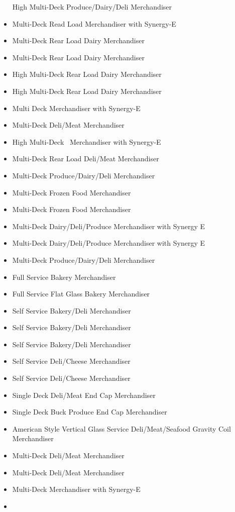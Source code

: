 \begin{itemize}
  High Multi-Deck Produce/Dairy/Deli Merchandiser
\item
  Multi-Deck Read Load Merchandiser with Synergy-E
\item
  Multi-Deck Rear Load Dairy Merchandiser
\item
  Multi-Deck Rear Load Dairy Merchandiser
\item
  High Multi-Deck Rear Load Dairy Merchandiser
\item
  High Multi-Deck Rear Load Dairy Merchandiser
\item
  Multi Deck Merchandiser with Synergy-E
\item
  Multi-Deck Deli/Meat Merchandiser
\item
  High Multi-Deck~ Merchandiser with Synergy-E
\item
  Multi-Deck Rear Load Deli/Meat Merchandiser
\item
  Multi-Deck Produce/Dairy/Deli Merchandiser
\item
  Multi-Deck Frozen Food Merchandiser
\item
  Multi-Deck Frozen Food Merchandiser
\item
  Multi-Deck Dairy/Deli/Produce Merchandiser with Synergy E
\item
  Multi-Deck Dairy/Deli/Produce Merchandiser with Synergy E
\item
  Multi-Deck Produce/Dairy/Deli Merchandiser
\item
  Full Service Bakery Merchandiser
\item
  Full Service Flat Glass Bakery Merchandiser
\item
  Self Service Bakery/Deli Merchandiser
\item
  Self Service Bakery/Deli Merchandiser
\item
  Self Service Bakery/Deli Merchandiser
\item
  Self Service Deli/Cheese Merchandiser
\item
  Self Service Deli/Cheese Merchandiser
\item
  Single Deck Deli/Meat End Cap Merchandiser
\item
  Single Deck Buck Produce End Cap Merchandiser
\item
  American Style Vertical Glass Service Deli/Meat/Seafood Gravity Coil Merchandiser
\item
  Multi-Deck Deli/Meat Merchandiser
\item
  Multi-Deck Deli/Meat Merchandiser
\item
  Multi-Deck Merchandiser with Synergy-E
\item

\end{itemize}
